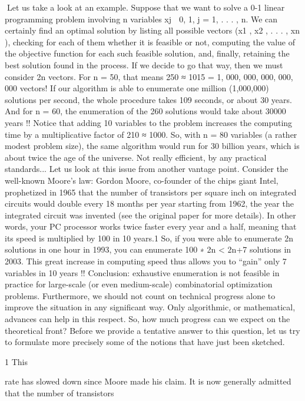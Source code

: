 \documentclass[titlepage]{book}
\theoremstyle{plain}
\theoremstyle{definition}
\theoremstyle{remark}
\begin{document}
Let us take a look at an example. Suppose that we want to solve a 0-1 linear programming problem
involving n variables xj ∈ {0, 1}, j = 1, . . . , n. We can certainly find an optimal solution by listing all
possible vectors (x1 , x2 , . . . , xn ), checking for each of them whether it is feasible or not, computing the
value of the objective function for each such feasible solution, and, finally, retaining the best solution
found in the process. If we decide to go that way, then we must consider 2n vectors. For n = 50, that
means 250 ≈ 1015 = 1, 000, 000, 000, 000, 000 vectors! If our algorithm is able to enumerate one million
(1,000,000) solutions per second, the whole procedure takes 109 seconds, or about 30 years. And for
n = 60, the enumeration of the 260 solutions would take about 30000 years !!
Notice that adding 10 variables to the problem increases the computing time by a multiplicative factor
of 210 ≈ 1000. So, with n = 80 variables (a rather modest problem size), the same algorithm would run
for 30 billion years, which is about twice the age of the universe. Not really efficient, by any practical
standards...
Let us look at this issue from another vantage point. Consider the well-known Moore's law: Gordon
Moore, co-founder of the chips giant Intel, prophetized in 1965 that the number of transistors per square
inch on integrated circuits would double every 18 months per year starting from 1962, the year the
integrated circuit was invented (see the original paper for more details). In other words, your PC processor
works twice faster every year and a half, meaning that its speed is multiplied by 100 in 10 years.1 So, if
you were able to enumerate 2n solutions in one hour in 1993, you can enumerate 100 ∗ 2n < 2n+7 solutions
in 2003. This great increase in computing speed thus allows you to “gain” only 7 variables in 10 years !!
Conclusion: exhaustive enumeration is not feasible in practice for large-scale (or even medium-scale)
combinatorial optimization problems. Furthermore, we should not count on technical progress alone to
improve the situation in any significant way. Only algorithmic, or mathematical, advances can help in
this respect.
So, how much progress can we expect on the theoretical front? Before we provide a tentative answer to
this question, let us try to formulate more precisely some of the notions that have just been sketched.

1 This

rate has slowed down since Moore made his claim. It is now generally admitted that the number of transistors
\end{document}
